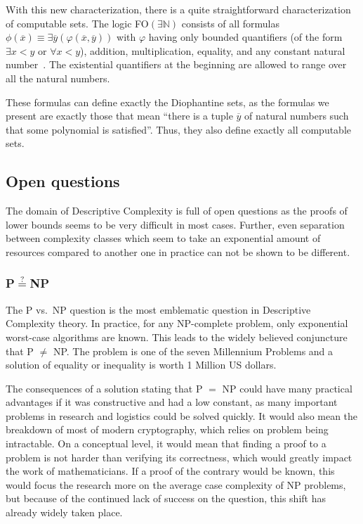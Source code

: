 With this new characterization, there is a quite straightforward characterization of computable sets.
The logic \acs{FO}$(\exists \mathbb{N})$ consists of all formulas $\phi(\overline{x}) \equiv \exists \overline{y} (\varphi(\overline{x}, \overline{y}))$ with $\varphi$ having only bounded quantifiers (of the form $\exists x < y$ or $\forall x < y$), addition, multiplication, equality, and any constant natural number~\cite{Entropy2020}.
The existential quantifiers at the beginning are allowed to range over all the natural numbers.

These formulas can define exactly the Diophantine sets, as the formulas we present are exactly those that mean ``there is a tuple $\overline{y}$ of natural numbers such that some polynomial is satisfied''.
Thus, they also define exactly all computable sets.

\subsection{Open questions}\label{subsec:open-questions}

The domain of Descriptive Complexity is full of open questions as the proofs of lower bounds seems to be very difficult in most cases.
Further, even separation between complexity classes which seem to take an exponential amount of resources compared to another one in practice can not be shown to be different.

\subsubsection{\acs{P}$\overset{?}{=}$\acs{NP}}\label{subsubsec:pnp}
The \acs{P} vs.~\acs{NP} question is the most emblematic question in Descriptive Complexity theory.
In practice, for any \acs{NP}-complete problem, only exponential worst-case algorithms are known.
This leads to the widely believed conjuncture that \acs{P} $\neq$ \acs{NP}\@.
The problem is one of the seven Millennium Problems and a solution of equality or inequality is worth 1 Million US dollars.

The consequences of a solution stating that \acs{P} $=$ \acs{NP} could have many practical advantages if it was constructive and had a low constant, as many important problems in research and logistics could be solved quickly.
It would also mean the breakdown of most of modern cryptography, which relies on problem being intractable.
On a conceptual level, it would mean that finding a proof to a problem is not harder than verifying its correctness, which would greatly impact the work of mathematicians.
If a proof of the contrary would be known, this would focus the research more on the average case complexity of \acs{NP} problems, but because of the continued lack of success on the question, this shift has already widely taken place.

